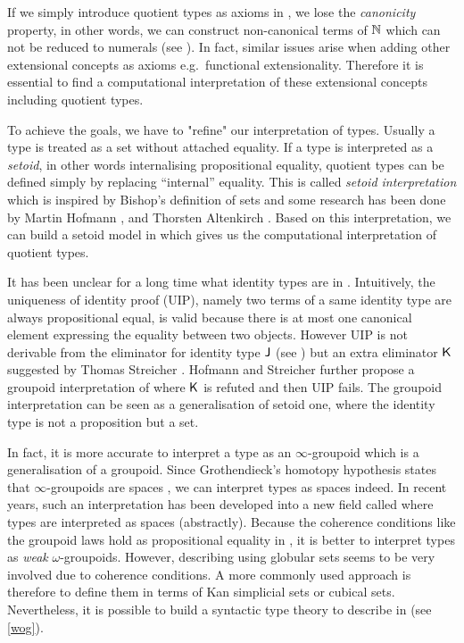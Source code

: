 If we simply introduce quotient types as axioms in \itt, we lose the \emph{canonicity} property, in other words, we can construct non-canonical terms of $\mathbb{N}$ which can not be reduced to numerals (see ). In fact, similar issues arise when adding other extensional concepts as axioms e.g.\ functional extensionality. Therefore it is essential to find a computational interpretation of these extensional concepts including quotient types.

To achieve the goals, we have to "refine" our interpretation of types. Usually a type is treated as a set without attached equality. If a type is interpreted as a \emph{setoid}, in other words internalising propositional equality, quotient types can be defined simply by replacing ``internal'' equality. This is called \emph{setoid interpretation} which is inspired by Bishop's \cite{bishop} definition of sets and 
some research has been done by Martin Hofmann \cite{hof:phd,hof:95:sm}, and Thorsten Altenkirch \cite{alti:lics99,alti:ott-conf}. Based on this interpretation, we can build a setoid model in \itt which gives us the  computational interpretation of quotient types.

It has been unclear for a long time what identity types are in \itt. Intuitively, the uniqueness of identity proof (UIP), namely two terms of a same identity type are always propositional equal, is valid because there is at most one canonical element expressing the equality between two objects. However UIP is not derivable from the eliminator for identity type $\operatorname{\mathsf{J}}$ (see ) but an extra eliminator $\operatorname{\mathsf{K}}$ suggested by Thomas Streicher \cite{streicherinvestigations}.
Hofmann and Streicher further \cite{MR1686862} propose a groupoid interpretation of \itt where $\operatorname{\mathsf{K}}$ is refuted and then UIP fails. The groupoid interpretation  can be seen as a generalisation of setoid one, where the identity type is not a proposition but a set. 

In fact, it is more accurate to interpret a type as an $\infty$-groupoid which is a generalisation of a groupoid. Since Grothendieck's homotopy hypothesis states that $\infty$-groupoids are spaces \cite{homotopyhyp}, we can interpret types as spaces indeed. In recent years, such an interpretation has been developed into a new field called \hott where types are interpreted as spaces (abstractly).
Because the coherence conditions like the groupoid laws hold as propositional equality in \itt, it is better to interpret types as \emph{weak} $\omega$-groupoids. However, describing \wog using globular sets seems to be very involved due to coherence conditions. A more commonly used approach is therefore to define them in terms of Kan simplicial sets or cubical sets. 
Nevertheless, it is possible to build a syntactic type theory to describe \wog in \itt (see \autoref{wog}).

